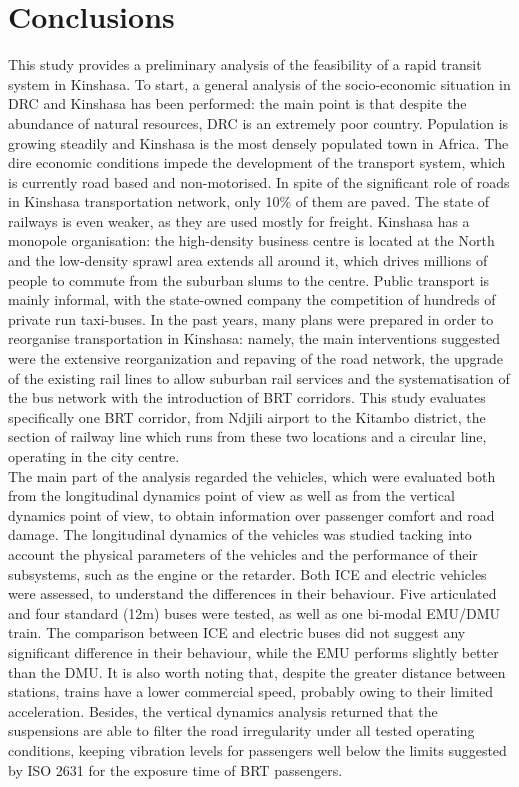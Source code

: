 \documentclass{article}
\begin{document}
\section{Conclusions} %
This study provides a preliminary analysis of the feasibility of a rapid transit system in Kinshasa. To start, a general analysis of the socio-economic situation in DRC and Kinshasa has been performed: the main point is that despite the abundance of natural resources, DRC is an extremely poor country. Population is growing steadily and Kinshasa is the most densely populated town in Africa. The dire economic conditions impede the development of the transport system, which is currently road based and non-motorised. In spite of the significant role of roads in Kinshasa transportation network, only 10\% of them are paved. The state of railways is even weaker, as they are used mostly for freight. Kinshasa has a monopole organisation: the high-density business centre is located at the North and the low-density sprawl area extends all around it, which drives millions of people to commute from the suburban slums to the centre. Public transport is mainly informal, with the state-owned company the competition of hundreds of private run taxi-buses. In the past years, many plans were prepared in order to reorganise transportation in Kinshasa: namely, the main interventions suggested were the extensive reorganization and repaving of the road network, the upgrade of the existing rail lines to allow suburban rail services and the systematisation of the bus network with the introduction of BRT corridors. This study evaluates specifically one BRT corridor, from Ndjili airport to the Kitambo district, the section of railway line which runs from these two locations and a circular line, operating in the city centre.\\
The main part of the analysis regarded the vehicles, which were evaluated both from the longitudinal dynamics point of view as well as from the vertical dynamics point of view, to obtain information over passenger comfort and road damage. The longitudinal dynamics of the vehicles was studied tacking into account the physical parameters of the vehicles and the performance of their subsystems, such as the engine or the retarder. Both ICE and electric vehicles were assessed, to understand the differences in their behaviour. Five articulated and four standard (12m) buses were tested, as well as one bi-modal EMU/DMU train. The comparison between ICE and electric buses did not suggest any significant difference in their behaviour, while the EMU performs slightly better than the DMU. It is also worth noting that, despite the greater distance between stations, trains have a lower commercial speed, probably owing to their limited acceleration. Besides, the vertical dynamics analysis returned that the suspensions are able to filter the road irregularity under all tested operating conditions, keeping vibration levels for passengers well below the limits suggested by ISO 2631 for the exposure time of BRT passengers.\\
\end{document}
